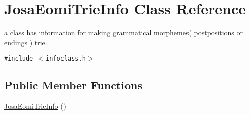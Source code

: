 \hypertarget{classJosaEomiTrieInfo}{
\section{JosaEomiTrieInfo Class Reference}
\label{classJosaEomiTrieInfo}
}
a class has information for making grammatical morphemes( postpositions or endings ) trie.  


{\tt \#include $<$infoclass.h$>$}

\subsection*{Public Member Functions}
\begin{CompactItemize}
\item 
\hyperlink{classJosaEomiTrieInfo_9538e25d6044352f08462665e0473084}{JosaEomiTrieInfo} ()
\end{CompactItemize}
